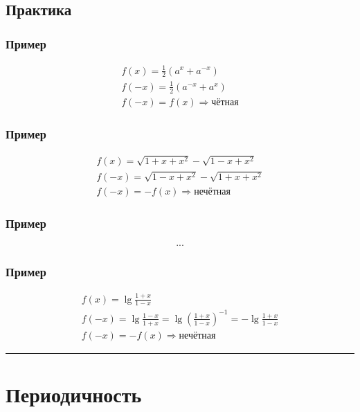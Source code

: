 \documentclass{article}
\begin{document}
\subsection{Практика}

\subsubsection{Пример}
\begin{gather*}
    f(x) = \frac{1}{2} (a^x + a^{-x}) \\
    f(-x) = \frac{1}{2} (a^{-x} + a^x) \\
    f(-x) = f(x) \Rightarrow \text{чётная}
\end{gather*}

\subsubsection{Пример}
\begin{gather*}
    f(x) = \sqrt{1 + x + x^2} - \sqrt{1 - x + x^2} \\
    f(-x) = \sqrt{1 - x + x^2} - \sqrt{1 + x + x^2} \\
    f(-x) = -f(x) \Rightarrow \text{нечётная}
\end{gather*}

\subsubsection{Пример}
\begin{gather*}
    ...
\end{gather*}

\subsubsection{Пример}
\begin{gather*}
    f(x) = \lg \frac{1 + x}{1 - x} \\
    f(-x) = \lg \frac{1 - x}{1 + x} = \lg \left( \frac{1 + x}{1 - x} \right)^{-1} = -\lg \frac{1 + x}{1 - x} \\
    f(-x) = -f(x) \Rightarrow \text{нечётная}
\end{gather*}



\par\noindent\rule{\textwidth}{1pt}
\section{Периодичность}
\end{document}
